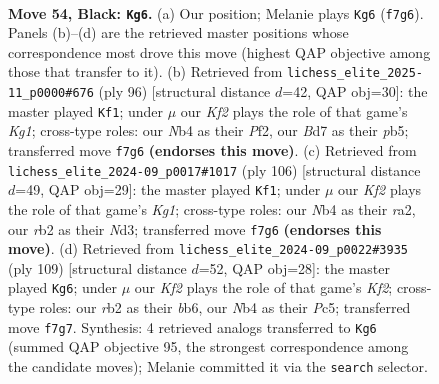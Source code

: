\documentclass[11pt]{article}
\begin{document}
\clearpage

\begin{figure}[p]\centering
\begin{subfigure}{0.46\textwidth}\centering
\resizebox{\linewidth}{!}{%
\newchessgame
\chessboard[
  setfen={1R1B4/3b1k2/2r5/1p6/rn4P1/4P2p/1R3P2/7K b - - 0 54},
  showmover=false,
  pgfstyle=straightmove, color=movearrow, markmove={f7-g6}
]}
\caption{}
\end{subfigure}\hfill
\begin{subfigure}{0.46\textwidth}\centering
\resizebox{\linewidth}{!}{%
\newchessgame
\chessboard[
  setfen={6b1/k1pr4/P7/1p3N1R/6P1/3p4/4rP2/3R2K1 w - - 0 49},
  showmover=false,
  pgfstyle=straightmove, color=movearrow, markmove={g1-f1}
]}
\caption{}
\end{subfigure}
\\[4pt]
\begin{subfigure}{0.46\textwidth}\centering
\resizebox{\linewidth}{!}{%
\newchessgame
\chessboard[
  setfen={1b6/6rk/R7/1P1p3p/3P3P/p2N4/r5P1/4R1K1 w - - 5 54},
  showmover=false,
  pgfstyle=straightmove, color=movearrow, markmove={g1-f1}
]}
\caption{}
\end{subfigure}\hfill
\begin{subfigure}{0.46\textwidth}\centering
\resizebox{\linewidth}{!}{%
\newchessgame
\chessboard[
  setfen={8/5k2/1B6/2p2p2/P1P5/3r2n1/P4R1K/8 b - - 1 55},
  showmover=false,
  pgfstyle=straightmove, color=movearrow, markmove={f7-g6}
]}
\caption{}
\end{subfigure}
\caption{\textbf{Move 54, Black: \texttt{Kg6}.} (a) Our position; Melanie plays \texttt{Kg6} (\texttt{f7g6}). Panels (b)--(d) are the retrieved master positions whose correspondence most drove this move (highest QAP objective among those that transfer to it). (b) Retrieved from \texttt{lichess\_elite\_2025-11\_p0000\#676} (ply 96) [structural distance $d$=42, QAP obj=30]: the master played \texttt{Kf1}; under $\mu$ our \emph{Kf2} plays the role of that game's \emph{Kg1}; cross-type roles: our \emph{N}b4 as their \emph{P}f2, our \emph{B}d7 as their \emph{p}b5; transferred move \texttt{f7g6} \textbf{(endorses this move)}. (c) Retrieved from \texttt{lichess\_elite\_2024-09\_p0017\#1017} (ply 106) [structural distance $d$=49, QAP obj=29]: the master played \texttt{Kf1}; under $\mu$ our \emph{Kf2} plays the role of that game's \emph{Kg1}; cross-type roles: our \emph{N}b4 as their \emph{r}a2, our \emph{r}b2 as their \emph{N}d3; transferred move \texttt{f7g6} \textbf{(endorses this move)}. (d) Retrieved from \texttt{lichess\_elite\_2024-09\_p0022\#3935} (ply 109) [structural distance $d$=52, QAP obj=28]: the master played \texttt{Kg6}; under $\mu$ our \emph{Kf2} plays the role of that game's \emph{Kf2}; cross-type roles: our \emph{r}b2 as their \emph{b}b6, our \emph{N}b4 as their \emph{P}c5; transferred move \texttt{f7g7}. Synthesis: 4 retrieved analogs transferred to \texttt{Kg6} (summed QAP objective 95, the strongest correspondence among the candidate moves); Melanie committed it via the \texttt{search} selector.}
\label{fig:thought-m107}
\end{figure}
\end{document}
